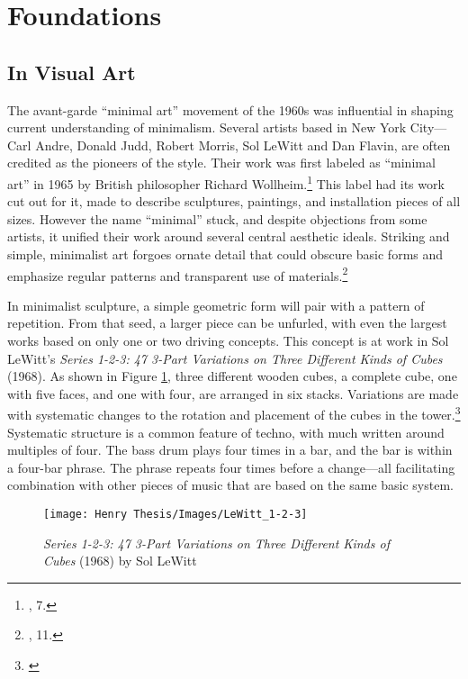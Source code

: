 \documentclass[12pt,twoside]{reedthesis}
\begin{document}
\section{Foundations}

\subsection{In Visual Art}
The avant-garde ``minimal art'' movement of the 1960s was influential in shaping current understanding of minimalism. Several artists based in New York City---Carl Andre, Donald Judd, Robert Morris, Sol LeWitt and Dan Flavin, are often credited as the pioneers of the style. Their work was first labeled as ``minimal art'' in 1965 by British philosopher Richard Wollheim.\footnote{\cite{batchelorMinimalism1997}, 7.} This label had its work cut out for it, made to describe sculptures, paintings, and installation pieces of all sizes. However the name ``minimal'' stuck, and despite objections from some artists, it unified their work around several central aesthetic ideals. Striking and simple, minimalist art forgoes ornate detail that could obscure basic forms and emphasize regular patterns and transparent use of materials.\footnote{\cite{batchelorMinimalism1997}, 11.}

In minimalist sculpture, a simple geometric form will pair with a pattern of repetition. From that seed, a larger piece can be unfurled, with even the largest works based on only one or two driving concepts. This concept is at work in Sol LeWitt's \emph{Series 1-2-3: 47 3-Part Variations on Three Different Kinds of Cubes} (1968). As shown in Figure \ref{fig:sol}, three different wooden cubes, a complete cube, one with five faces, and one with four, are arranged in six stacks. Variations are made with systematic changes to the rotation and placement of the cubes in the tower.\footnote{\cite{lewittSeries123471968}} Systematic structure is a common feature of techno, with much written around multiples of four. The bass drum plays four times in a bar, and the bar is within a four-bar phrase. The phrase repeats four times before a change---all facilitating combination with other pieces of music that are based on the same basic system.

\begin{figure}[htbp]
\begin{centering} 
\texttt{[image: Henry Thesis/Images/LeWitt\_1-2-3]}
\caption{\emph{Series 1-2-3: 47 3-Part Variations on Three Different Kinds of Cubes} (1968) by Sol LeWitt}
\label{fig:sol}
\end{centering} 
\end{figure}
\end{document}
